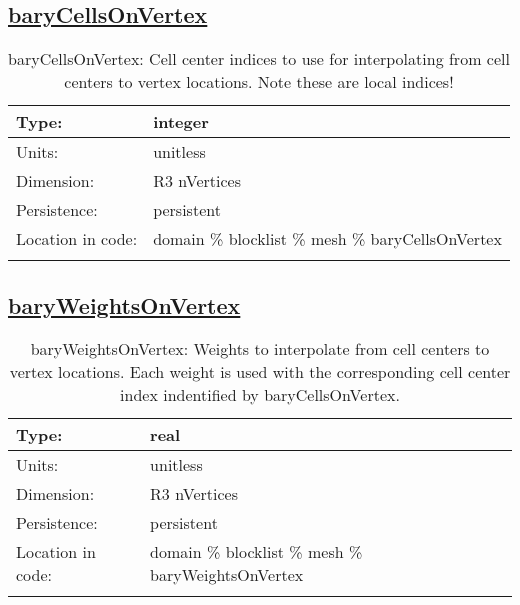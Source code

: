 \subsection[baryCellsOnVertex]{\hyperref[sec:var_tab_mesh]{baryCellsOnVertex}}
\label{subsec:var_sec_mesh_baryCellsOnVertex}
\begin{center}
\begin{longtable}{| p{2.0in} | p{4.0in} |}
        \hline 
        Type: & integer \\
        \hline 
        Units: & \si{unitless} \\
        \hline 
        Dimension: & R3 nVertices \\
        \hline 
        Persistence: & persistent \\
        \hline 
         Location in code: & domain \% blocklist \% mesh \% baryCellsOnVertex \\
         \hline 
    \caption{baryCellsOnVertex: Cell center indices to use for interpolating from cell centers to vertex locations.  Note these are local indices!}
\end{longtable}
\end{center}
\subsection[baryWeightsOnVertex]{\hyperref[sec:var_tab_mesh]{baryWeightsOnVertex}}
\label{subsec:var_sec_mesh_baryWeightsOnVertex}
\begin{center}
\begin{longtable}{| p{2.0in} | p{4.0in} |}
        \hline 
        Type: & real \\
        \hline 
        Units: & \si{unitless} \\
        \hline 
        Dimension: & R3 nVertices \\
        \hline 
        Persistence: & persistent \\
        \hline 
         Location in code: & domain \% blocklist \% mesh \% baryWeightsOnVertex \\
         \hline 
    \caption{baryWeightsOnVertex: Weights to interpolate from cell centers to vertex locations.  Each weight is used with the corresponding cell center index indentified by baryCellsOnVertex.}
\end{longtable}
\end{center}
